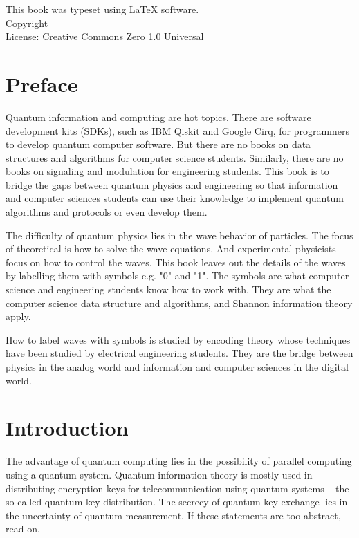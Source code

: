 \documentclass{book}
\makeatletter
\newcommand{\booklicense}{Creative Commons Zero 1.0 Universal}
\newcommand{\bookauthor}{\@author}
\makeatother
\begin{document}
\begin{flushleft}
\vspace*{\fill}
This book was typeset using \LaTeX{} software.\\
\vspace{\fill}
Copyright \textcopyright{} \the\year{}  \bookauthor\\
License: \booklicense
\end{flushleft}

\addtocounter{page}{2}

\chapter*{Preface}
Quantum information and computing are hot topics. There are software development kits (SDKs), such as IBM Qiskit and Google Cirq, for programmers to develop quantum computer software. But there are no books on data structures and algorithms for computer science students. Similarly, there are no books on signaling and modulation for engineering students. This book is to bridge the gaps between quantum physics and engineering so that information and computer sciences students can use their knowledge to implement quantum algorithms and protocols or even develop them.

The difficulty of quantum physics lies in the wave behavior of particles. The focus of theoretical is how to solve the wave equations. And experimental physicists focus on how to control the waves. This book leaves out the details of the waves by labelling them with symbols e.g. "0" and "1". The symbols are what computer science and engineering students know how to work with. They are what the computer science data structure and algorithms, and Shannon information theory apply.

How to label waves with symbols is studied by encoding theory whose techniques have been studied by electrical engineering students. They are the bridge between physics in the analog world and information and computer sciences in the digital world.

\setcounter{tocdepth}{3}
\tableofcontents

\mainmatter

\chapter{Introduction}
The advantage of quantum computing lies in the possibility of parallel computing using a quantum system. Quantum information theory is mostly used in distributing encryption keys for telecommunication using quantum systems -- the so called quantum key distribution. The secrecy of quantum key exchange lies in the uncertainty of quantum measurement. If these statements are too abstract, read on.
\end{document}
